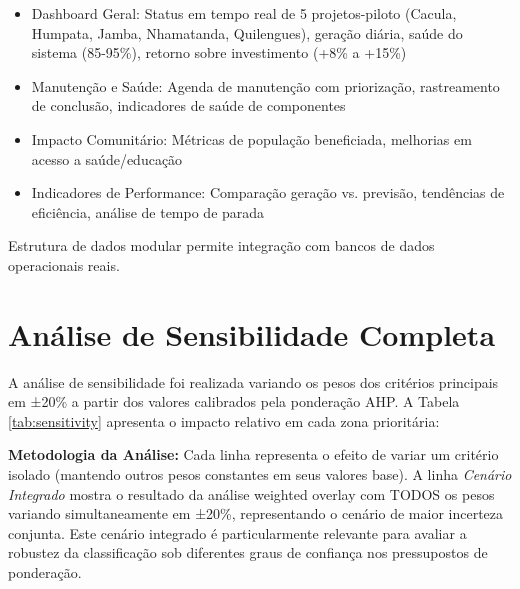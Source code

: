 \documentclass[12pt, a4paper]{article}
\begin{document}
{{{{{{{{{{{{\begin{itemize}
    \item Dashboard Geral: Status em tempo real de 5 projetos-piloto (Cacula, Humpata, Jamba, Nhamatanda, Quilengues), geração diária, saúde do sistema (85-95\%), retorno sobre investimento (+8\% a +15\%)
    \item Manutenção e Saúde: Agenda de manutenção com priorização, rastreamento de conclusão, indicadores de saúde de componentes
    \item Impacto Comunitário: Métricas de população beneficiada, melhorias em acesso a saúde/educação
    \item Indicadores de Performance: Comparação geração vs. previsão, tendências de eficiência, análise de tempo de parada
\end{itemize}

Estrutura de dados modular permite integração com bancos de dados operacionais reais.

\section{Análise de Sensibilidade Completa}

A análise de sensibilidade foi realizada variando os pesos dos critérios principais em ±20\% a partir dos valores calibrados pela ponderação AHP. A Tabela \ref{tab:sensitivity} apresenta o impacto relativo em cada zona prioritária:

\textbf{Metodologia da Análise:} Cada linha representa o efeito de variar um critério isolado (mantendo outros pesos constantes em seus valores base). A linha \textit{Cenário Integrado} mostra o resultado da análise weighted overlay com TODOS os pesos variando simultaneamente em ±20\%, representando o cenário de maior incerteza conjunta. Este cenário integrado é particularmente relevante para avaliar a robustez da classificação sob diferentes graus de confiança nos pressupostos de ponderação.

}}}}}}}}}}}}
\end{document}
